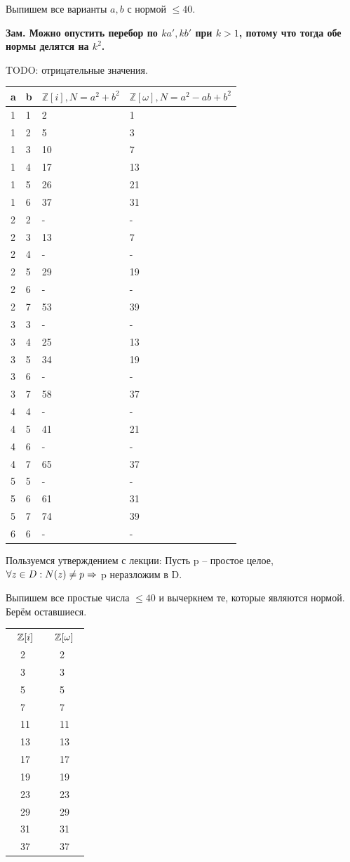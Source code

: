\begin{solution}

Выпишем все варианты \(a, b\) с нормой \(\le 40\).

\bf{Зам.} Можно опустить перебор по \(ka', kb'\) при \(k > 1\), потому что тогда обе нормы делятся на \(k^2\).

TODO: отрицательные значения.

\begin{longtable}[]{@{}llll@{}}
\toprule
a & b & \(\mathbb{Z}[i], N = a^2+b^2\) & \(\mathbb{Z}[\omega], N = a^2-ab+b^2\)\tabularnewline
\midrule
\endhead
1 & 1 & 2 & 1\tabularnewline
1 & 2 & 5 & 3\tabularnewline
1 & 3 & 10 & 7\tabularnewline
1 & 4 & 17 & 13\tabularnewline
1 & 5 & 26 & 21\tabularnewline
1 & 6 & 37 & 31\tabularnewline
2 & 2 & - & -\tabularnewline
2 & 3 & 13 & 7\tabularnewline
2 & 4 & - & -\tabularnewline
2 & 5 & 29 & 19\tabularnewline
2 & 6 & - & -\tabularnewline
2 & 7 & 53 & 39\tabularnewline
3 & 3 & - & -\tabularnewline
3 & 4 & 25 & 13\tabularnewline
3 & 5 & 34 & 19\tabularnewline
3 & 6 & - & -\tabularnewline
3 & 7 & 58 & 37\tabularnewline
4 & 4 & - & -\tabularnewline
4 & 5 & 41 & 21\tabularnewline
4 & 6 & - & -\tabularnewline
4 & 7 & 65 & 37\tabularnewline
5 & 5 & - & -\tabularnewline
5 & 6 & 61 & 31\tabularnewline
5 & 7 & 74 & 39\tabularnewline
6 & 6 & - & -\tabularnewline
\bottomrule
\end{longtable}

Пользуемся утверждением с лекции: Пусть p -- простое целое, \(\forall z \in D: N(z)\ne p \Rightarrow\) p неразложим в D.

Выпишем все простые числа \(\le 40\) и вычеркнем те, которые являются нормой. Берём оставшиеся.

\begin{table}[H]
\centering
\begin{tabular}{llllll}
\multicolumn{3}{c}{$\mathbb{Z}[i]$} & \multicolumn{3}{c}{$\mathbb{Z}[\omega]$} \\
        & 2      & \x     & \y       & 2        &          \\
\y      & 3      &        &          & 3        & \x       \\
        & 5      & \x     & \y       & 5        &          \\
\y      & 7      &        &          & 7        & \x       \\
\y      & 11     &        & \y       & 11       &          \\
        & 13     & \x     &          & 13       & \x       \\
        & 17     & \x     & \y       & 17       &          \\
\y      & 19     &        &          & 19       & \x       \\
\y      & 23     &        & \y       & 23       &          \\
        & 29     & \x     & \y       & 29       &          \\
\y      & 31     &        &          & 31       & \x       \\
        & 37     & \x     &          & 37       & \x        
\end{tabular}
\end{table}


\end{solution}
